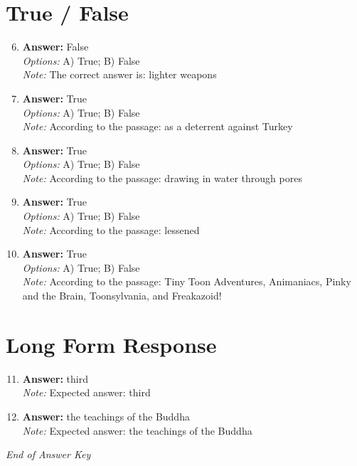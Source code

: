 \documentclass[12pt]{article}
\begin{document}
\section*{True / False}
\begin{enumerate}[label=\arabic*.]
\setcounter{enumi}{5}
\item \textbf{Answer:} False
\\ \textit{Options:} A) True; B) False
\\ \textit{Note:} The correct answer is: lighter weapons
\item \textbf{Answer:} True
\\ \textit{Options:} A) True; B) False
\\ \textit{Note:} According to the passage: as a deterrent against Turkey
\item \textbf{Answer:} True
\\ \textit{Options:} A) True; B) False
\\ \textit{Note:} According to the passage: drawing in water through pores
\item \textbf{Answer:} True
\\ \textit{Options:} A) True; B) False
\\ \textit{Note:} According to the passage: lessened
\item \textbf{Answer:} True
\\ \textit{Options:} A) True; B) False
\\ \textit{Note:} According to the passage: Tiny Toon Adventures, Animaniacs, Pinky and the Brain, Toonsylvania, and Freakazoid!
\end{enumerate}

\section*{Long Form Response}
\begin{enumerate}[label=\arabic*.]
\setcounter{enumi}{10}
\item \textbf{Answer:} third
\\ \textit{Note:} Expected answer: third
\item \textbf{Answer:} the teachings of the Buddha
\\ \textit{Note:} Expected answer: the teachings of the Buddha
\end{enumerate}

\vfill
\noindent\textit{End of Answer Key}
\end{document}
